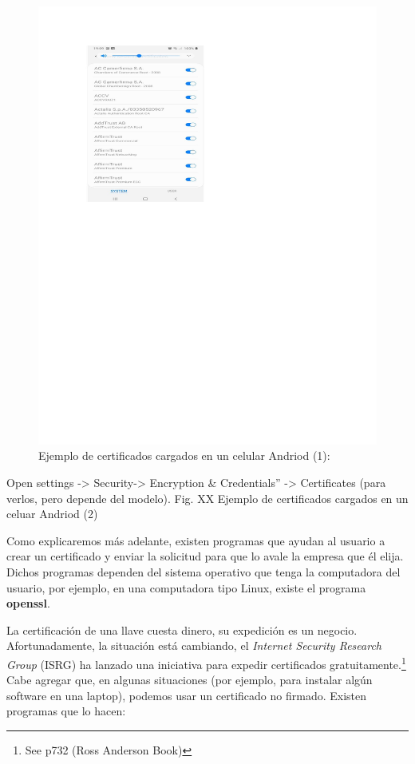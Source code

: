 \documentclass[12pt]{report} %
\begin{document}
\begin{itemize}
\begin{figure}
\centering
\includegraphics[width=0.85\columnwidth]{imagenes/certifenandroid.pdf}
\caption{Ejemplo de certificados cargados en un celular Andriod (1):}
\label{Fig.ejemplocertificadonAndroid}
\end{figure} 

Open settings -> Security-> Encryption \& Credentials” -> Certificates (para verlos, pero depende del modelo).
Fig. XX  Ejemplo de certificados cargados en un celuar Andriod (2)


Como explicaremos más adelante, existen programas que ayudan al usuario a crear un certificado y enviar la solicitud para que lo avale la empresa que él elija. Dichos programas dependen del sistema operativo que tenga la computadora del usuario, por ejemplo, en una computadora tipo Linux, existe el programa \textbf{openssl}.

La certificación de una llave cuesta dinero, su expedición es un negocio. Afortunadamente, la situación está cambiando, el \textit{Internet Security Research Group}  (ISRG) ha lanzado una iniciativa para expedir certificados gratuitamente.\footnote{See p732 (Ross Anderson Book)}  Cabe agregar que, en algunas situaciones (por ejemplo, para instalar algún software en una laptop), podemos usar un certificado no firmado. Existen programas que lo hacen:


\end{itemize}
\end{document}
